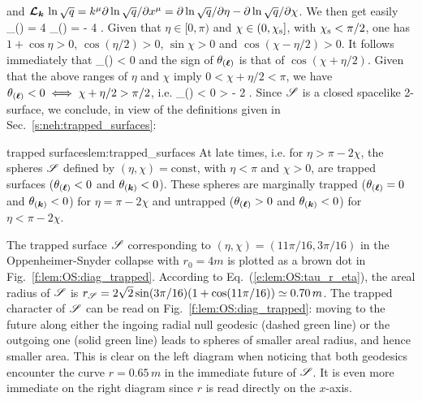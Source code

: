  and
 $\bm{\mathcal{L}}_{\bm{\bm{k}}}\, \ln \sqrt{q} = k^\mu \partial \ln\sqrt{q} /\partial x^\mu =
 \partial \ln\sqrt{q} /\partial \eta - \partial\ln  \sqrt{q} /\partial \chi$.
We then get easily
\be
    \theta_{(\wl)} = 4 
    \qand
    \theta_{()} = - 4  .
\ee
Given that $\eta\in [0,\pi)$ %
and $\chi\in(0,\chi_{\rm s}]$, with $\chi_{\rm s} < \pi/2$,
one has $1 + \cos\eta > 0$, $\cos(\eta/2) > 0$, $\sin\chi > 0$
and $\cos(\chi - \eta/2) > 0$. It follows immediately that
\be
    \theta_{()} < 0
\ee
and the sign of $\theta_{(\bm{\ell})}$ is that of $\cos(\chi + \eta/2)$.
Given that the above ranges of $\eta$ and $\chi$ imply $0 < \chi + \eta/2 < \pi$,
we have $\theta_{(\bm{\ell})} < 0 \iff \chi + \eta/2 > \pi/2$, i.e.
\be \label{e:lem:theta_l_neg}
    \theta_{(\wl)} < 0 \iff \eta > \pi - 2 \chi .
\ee
Since $\mathscr{S}$ is a closed spacelike 2-surface,
we conclude, in view of the definitions given in Sec.~\ref{s:neh:trapped_surfaces}:

\begin{tprop}{trapped surfaces}{lem:trapped_surfaces}
At late times, i.e. for $\eta > \pi - 2 \chi$, the spheres $\mathscr{S}$ defined
by $(\eta,\chi) = \mathrm{const}$, with $\eta<\pi$ and $\chi>0$,
are trapped surfaces ($\theta_{(\bm{\ell})} < 0$ and $\theta_{(\bm{k})} < 0$).
These spheres are marginally trapped
($\theta_{(\bm{\ell})} = 0$ and $\theta_{(\bm{k})} < 0$)
for $\eta = \pi - 2 \chi$
and untrapped ($\theta_{(\bm{\ell})} > 0$ and $\theta_{(\bm{k})} < 0$) for $\eta <  \pi - 2 \chi$.
\end{tprop}

\begin{texample}{}{}
The trapped surface $\mathscr{S}$ corresponding to $(\eta,\chi) = (11\pi/16, 3\pi/16)$
in the Oppen\-heimer-Snyder collapse with $r_0 = 4 m$
is plotted as a brown dot in Fig.~\ref{f:lem:OS:diag_trapped}. According
to Eq.~(\ref{e:lem:OS:tau_r_eta}), the areal radius of $\mathscr{S}$ is
$r_{\mathscr{S}} = 2\sqrt{2} \sin(3\pi/16) (1 + \cos(11\pi/16)) \simeq 0.70\, m$.
The trapped character of $\mathscr{S}$ can be read on Fig.~\ref{f:lem:OS:diag_trapped}:
moving to the future along either the ingoing radial null geodesic (dashed green line)
or the outgoing one (solid green line) leads to spheres of smaller areal radius,
and hence smaller area. This is clear on the left diagram when noticing
that both geodesics encounter the curve $r=0.65\, m$ in the immediate future of $\mathscr{S}$.
It is even more immediate on the right diagram since $r$ is read directly on the $x$-axis.
\end{texample}

